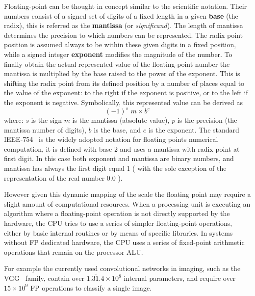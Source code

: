 Floating-point can be thought in concept similar to the scientific notation. Their numbers consist of a signed set of digits of a fixed length in a given \textbf{base} (the radix), this is referred as the \textbf{mantissa} (or \textit{significand}). The length of mantissa determines the precision to which numbers can be represented. The radix point position is assumed always to be within these given digits in a fixed position, while a signed integer \textbf{exponent} modifies the magnitude of the number.
To finally obtain the actual represented value of the floating-point number the mantissa is multiplied by the base raised to the power of the exponent. This is shifting the radix point from its defined position by a number of places equal to the value of the exponent: to the right if the exponent is positive, or to the left if the exponent is negative.
Symbolically, this represented value can be derived as 
%
$$ (-1)^s \,\, m \times b^e $$
%
where: $s$ is the sign $m$ is the mantissa (absolute value), $p$ is the precision (the mantissa number of digits), $b$ is the base, and $e$ is the exponent.
The standard IEEE-754~\cite{1985--ieee754} is the widely adopted notation for floating points numerical computation, it is defined with base 2 and uses a mantissa with radix point at first digit. In this case both exponent and mantissa are binary numbers, and mantissa has always the first digit equal 1 ( with the sole exception of the representation of the real number 0.0 ). 





However given this dynamic mapping of the scale the floating point may require a slight amount of computational resources.
When a processing unit is executing an algorithm where a floating-point operation is not directly supported by the hardware, the CPU tries to use a series of simpler floating-point operations, either by basic internal routines or by means of specific libraries.
In systems without \acs{FP} dedicated hardware, the CPU uses a series of fixed-point arithmetic operations that remain on the processor \ac{ALU}.

For example the currently used convolutional networks in imaging, such as the VGG~\cite{Simonyan15} family, contain over
$1.3\tilde1.4\times10^8$ internal parameters, and require over $15\times10^9$ \acs{FP} operations to classify a single image.

